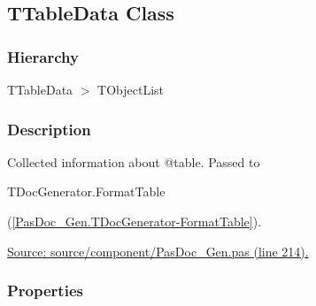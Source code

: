 \documentclass{report}
\begin{document}
\subsection*{TTableData Class}
\fi
\label{PasDoc_Gen.TTableData}
\subsubsection*{\large{\textbf{Hierarchy}}\normalsize\hspace{1ex}\hfill}
TTableData {$>$} TObjectList
\subsubsection*{\large{\textbf{Description}}\normalsize\hspace{1ex}\hfill}
Collected information about @table. Passed to \begin{ttfamily}TDocGenerator.FormatTable\end{ttfamily}(\ref{PasDoc_Gen.TDocGenerator-FormatTable}).\par
\href{https://github.com/pasdoc/pasdoc/blob/master/source/component/PasDoc_Gen.pas#L214}{Source: source/component/PasDoc{\_}Gen.pas (line 214).}\subsubsection*{\large{\textbf{Properties}}\normalsize\hspace{1ex}\hfill}
\end{document}
